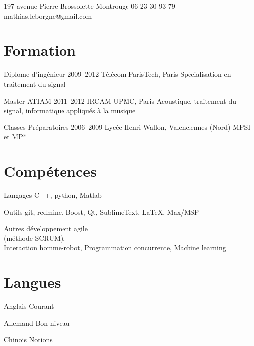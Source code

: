 \documentclass{tccv}
\begin{document}
\personal
    {197 avenue Pierre Brossolette
      Montrouge}
    {06 23 30 93 79}
    {mathias.leborgne@gmail.com}

\section{Formation}

\begin{yearlist}

\item[Diplome d'ingénieur]{2009--2012}
     {Télécom ParisTech, Paris}
     {Spécialisation en traitement du signal}

\item[Master ATIAM]{2011--2012}
    {IRCAM-UPMC, Paris}
    {Acoustique, traitement du signal,
     informatique appliqués à la musique}

\item[Classes Préparatoires]{2006--2009}
    {Lycée Henri Wallon, Valenciennes (Nord)}
    {MPSI et MP*}

\end{yearlist}

\section{Compétences}

\begin{factlist}

\item{Langages}
     {C++, python, Matlab}

\item{Outils}
     {git, redmine, Boost, Qt, SublimeText, \LaTeX, Max/MSP}

\item{Autres}
     {développement agile \\
      (méthode SCRUM), \\
      Interaction homme-robot,
      Programmation concurrente,
      Machine learning}

\end{factlist}

\section{Langues}

\begin{factlist}

\item{Anglais}
    {Courant}
\item{Allemand}
    {Bon niveau}
\item{Chinois}
    {Notions}

\end{factlist}
\end{document}
